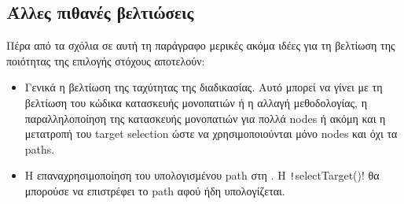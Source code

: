 \subsection{Άλλες πιθανές βελτιώσεις}
Πέρα από τα σχόλια σε αυτή τη παράγραφο μερικές ακόμα ιδέες για τη βελτίωση της ποιότητας της επιλογής στόχους αποτελούν:
\begin{itemize}
    \item Γενικά η βελτίωση της ταχύτητας της διαδικασίας.
          Αυτό μπορεί να γίνει με τη βελτίωση του κώδικα κατασκευής μονοπατιών ή η αλλαγή μεθοδολογίας, η παραλληλοποίηση της κατασκευής μονοπατιών για πολλά nodes ή ακόμη και η μετατροπή του target selection ώστε να χρησιμοποιούνται μόνο nodes και όχι τα paths.

    \item Η επαναχρησιμοποίηση του υπολογισμένου path στη .
          Η \texttt!selectTarget()! θα μπορούσε να επιστρέφει το path αφού ήδη υπολογίζεται.
\end{itemize}
